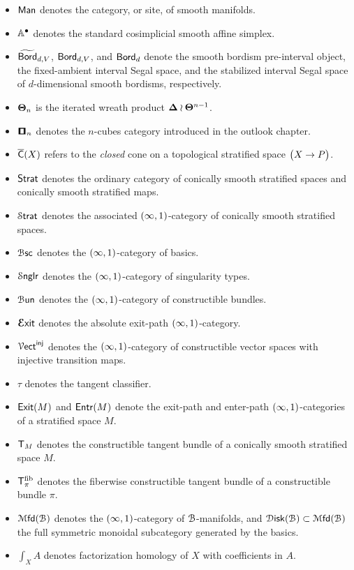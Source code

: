 \documentclass{amsbook}
\begin{document}
\begin{itemize}
    \item $\man$ denotes the category, or site, of smooth manifolds.
    \item $\AA^\bullet$ denotes the standard cosimplicial smooth affine simplex.
    \item $\widetilde{\bord}_{d,V}$, $\bord_{d,V}$, and $\bord_d$ denote the smooth bordism pre-interval object, the fixed-ambient interval Segal space, and the stabilized interval Segal space of $d$-dimensional smooth bordisms, respectively.
    \item $\bTheta_n$ is the iterated wreath product $\bDelta \wr \bTheta^{n-1}$.
    \item $\cube_n$ denotes the $n$-cubes category introduced in the outlook chapter.
    \item $\overline{\sC}(X)$ refers to the \emph{closed} cone on a topological stratified space $\big(X \ra P\big)$.
    \item $\strat$ denotes the ordinary category of conically smooth stratified spaces and conically smooth stratified maps.
    \item $\Strat$ denotes the associated $(\oo,1)$-category of conically smooth stratified spaces.
    \item $\Bsc$ denotes the $(\oo,1)$-category of basics.
    \item $\Snglr$ denotes the $(\oo,1)$-category of singularity types.
    \item $\Bun$ denotes the $(\oo,1)$-category of constructible bundles.
    \item $\Exit$ denotes the absolute exit-path $(\oo,1)$-category.
    \item $\Vect^{\inj}$ denotes the $(\oo,1)$-category of constructible vector spaces with injective transition maps.
    \item $\tau$ denotes the tangent classifier.
    \item $\exit(M)$ and $\entr(M)$ denote the exit-path and enter-path $(\oo,1)$-categories of a stratified space $M$.
    \item $\sT_M$ denotes the constructible tangent bundle of a conically smooth stratified space $M$.
    \item $\sT^{\mathrm{fib}}_{\pi}$ denotes the fiberwise constructible tangent bundle of a constructible bundle $\pi$.
    \item $\Mfd(\cB)$ denotes the $(\oo,1)$-category of $\cB$-manifolds, and $\Disk(\cB)\subset \Mfd(\cB)$ the full symmetric monoidal subcategory generated by the basics.
    \item $\int_X A$ denotes factorization homology of $X$ with coefficients in $A$.

\end{itemize}
\end{document}
